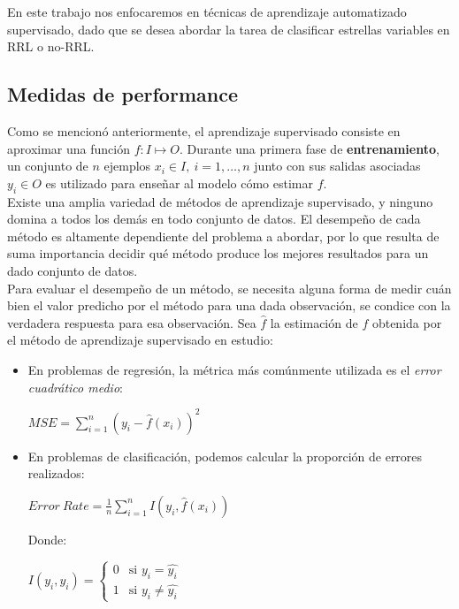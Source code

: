 En este trabajo nos enfocaremos en técnicas de aprendizaje automatizado supervisado, dado que se desea abordar la tarea de clasificar estrellas variables en RRL o no-RRL. 

\subsection{Medidas de performance}
\label{ml_intro_test}
Como se mencionó anteriormente, el aprendizaje supervisado consiste en aproximar una función $f : I \mapsto O$. Durante una primera fase de \textbf{entrenamiento}, un conjunto de $n$ ejemplos $x_i \in I, \ i=1,\ldots,n$ junto con sus salidas asociadas $y_i \in O$ es utilizado para enseñar al modelo cómo estimar $f$. \\

Existe una amplia variedad de métodos de aprendizaje supervisado, y ninguno domina a todos los demás en todo conjunto de datos. El desempeño de cada método es altamente dependiente del problema a abordar, por lo que resulta de suma importancia decidir qué método produce los mejores resultados para un dado conjunto de datos. \\

Para evaluar el desempeño de un método, se necesita alguna forma de medir cuán bien el valor predicho por el método para una dada observación, se condice con la verdadera respuesta para esa observación. Sea $\hat{f}$ la estimación de $f$ obtenida por el método de aprendizaje supervisado en estudio:

\begin{itemize}

\item  En problemas de regresión, la métrica más comúnmente utilizada es el \textit{error cuadrático medio}:

\begin{center}
$MSE = \sum_{i=1}^{n} ( y_i - \hat{f}(x_i) )^2 $
\end{center}

\item En problemas de clasificación, podemos calcular la proporción de errores realizados:

\begin{center}
$Error \ Rate = \frac{1}{n} \sum_{i=1}^{n} I( y_i , \hat{f}(x_i) ) $
\end{center}

Donde:
\begin{center}
$
I(y_i,\hat{y_i}) =
\left\{
	\begin{array}{ll}
		0  & \mbox{si } y_i = \hat{y_i} \\
		1 & \mbox{si } y_i \neq \hat{y_i}
	\end{array}
\right.
$
\end{center}

\end{itemize}

